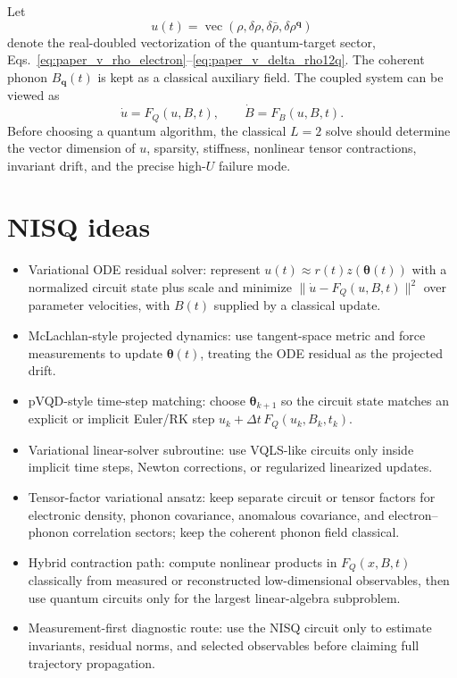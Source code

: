 \documentclass[
  reprint,
  amsmath,
  amssymb,
  aps,
  pra,
  nofootinbib,
  superscriptaddress,
  floatfix
]{revtex4-2}
\begin{document}
Let
\begin{equation}
u(t)=\operatorname{vec}
\left(
\rho,\delta\rho,\delta\bar\rho,\delta\rho^{\mathbf q}
\right)
\end{equation}
denote the real-doubled vectorization of the quantum-target sector, Eqs.~\eqref{eq:paper_v_rho_electron}--\eqref{eq:paper_v_delta_rho12q}. The coherent phonon \(B_{\mathbf q}(t)\) is kept as a classical auxiliary field. The coupled system can be viewed as
\begin{equation}
\dot u=F_Q(u,B,t),
\qquad
\dot B=F_B(u,B,t).
\label{eq:paper_v_vector_ode}
\end{equation}
Before choosing a quantum algorithm, the classical \(L=2\) solve should determine the vector dimension of \(u\), sparsity, stiffness, nonlinear tensor contractions, invariant drift, and the precise high-\(U\) failure mode.

\section{NISQ ideas}
\label{sec:nisq_ideas}

\begin{itemize}
\item Variational ODE residual solver: represent \(u(t)\approx r(t)z(\bm\theta(t))\) with a normalized circuit state plus scale and minimize \(\|\dot u-F_Q(u,B,t)\|^2\) over parameter velocities, with \(B(t)\) supplied by a classical update.
\item McLachlan-style projected dynamics: use tangent-space metric and force measurements to update \(\bm\theta(t)\), treating the ODE residual as the projected drift.
\item pVQD-style time-step matching: choose \(\bm\theta_{k+1}\) so the circuit state matches an explicit or implicit Euler/RK step \(u_k+\Delta t\,F_Q(u_k,B_k,t_k)\).
\item Variational linear-solver subroutine: use VQLS-like circuits only inside implicit time steps, Newton corrections, or regularized linearized updates.
\item Tensor-factor variational ansatz: keep separate circuit or tensor factors for electronic density, phonon covariance, anomalous covariance, and electron--phonon correlation sectors; keep the coherent phonon field classical.
\item Hybrid contraction path: compute nonlinear products in \(F_Q(x,B,t)\) classically from measured or reconstructed low-dimensional observables, then use quantum circuits only for the largest linear-algebra subproblem.
\item Measurement-first diagnostic route: use the NISQ circuit only to estimate invariants, residual norms, and selected observables before claiming full trajectory propagation.
\end{itemize}
\end{document}
